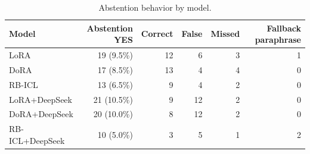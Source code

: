 \begin{table}[htbp]
\centering
\small
\begin{tabular}{lrrrrr}
\toprule
Model & Abstention YES & Correct & False & Missed & Fallback paraphrase \\
\midrule
LoRA & 19 (9.5\%) & 12 & 6 & 3 & 1 \\
DoRA & 17 (8.5\%) & 13 & 4 & 4 & 0 \\
RB-ICL & 13 (6.5\%) & 9 & 4 & 2 & 0 \\
LoRA+DeepSeek & 21 (10.5\%) & 9 & 12 & 2 & 0 \\
DoRA+DeepSeek & 20 (10.0\%) & 8 & 12 & 2 & 0 \\
RB-ICL+DeepSeek & 10 (5.0\%) & 3 & 5 & 1 & 2 \\
\bottomrule
\end{tabular}
\caption{Abstention behavior by model.}
\label{tab:abstention_analysis}
\end{table}
